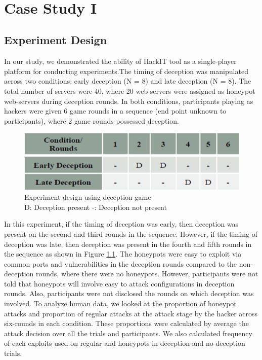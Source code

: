 \clearpage
\thispagestyle{empty}
~\clearpage
\chapter{Case Study I}
\label{chap3}
\section{Experiment Design}
In our study, we demonstrated the ability of HackIT tool as a single-player platform for conducting experiments.The timing of deception was manipulated across two conditions: early deception (N = 8) and late deception (N = 8). The total number of servers were 40, where 20 web-servers were assigned as honeypot web-servers during deception rounds. In both conditions, participants playing as hackers were given 6 game rounds in a sequence (end point unknown to participants), where 2 game rounds possessed deception. 
\FloatBarrier
\begin{figure}[!htbp]
\centering
  \includegraphics[scale=0.2]{Chap3/rounds.png}
  \caption{Experiment design using deception game\\D: Deception present -: Deception not present}\label{fig:figure8}
\end{figure}

In this experiment, if the timing of deception was early, then deception was present on the second and third rounds in the sequence. However, if the timing of deception was late, then deception was present in the fourth and fifth rounds in the sequence as shown in Figure \ref{fig:figure8}. The honeypots were easy to exploit via common ports and vulnerabilities in the deception rounds compared to the non-deception rounds, where there were no honeypots. However, participants were not told that honeypots will involve easy to attack configurations in deception rounds. Also, participants were not disclosed the rounds on which deception was involved. To analyze human data, we looked at the proportion of honeypot attacks and proportion of regular attacks at the attack stage by the hacker across six-rounds in each condition. These proportions were calculated by average the attack decision over all the trials and participants. We also calculated frequency of each exploits used on regular and honeypots in deception and no-deception trials.

